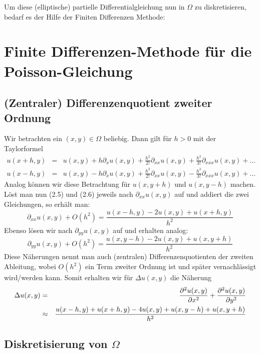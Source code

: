 Um diese (elliptische) partielle Differentialgleichung nun in $\Omega$ zu diskretisieren, bedarf es der Hilfe der Finiten Differenzen Methode:

\section{Finite Differenzen-Methode für die Poisson-Gleichung}\label{s.Finite Differenzen}

\subsection{(Zentraler) Differenzenquotient zweiter Ordnung}

Wir betrachten ein $(x,y) \in \Omega$ beliebig. Dann gilt für $h > 0$ mit der Taylorformel
\begin{eqnarray}
u(x+h,y) &=& u(x,y) + h \partial_{x} u(x,y) + \frac {h^{2}} {2!} \partial_{xx} u(x,y) + \frac {h^{3}} {3!} \partial_{xxx} u(x,y) + ... \\
u(x-h,y) &=& u(x,y) - h \partial_{x} u(x,y) + \frac {h^{2}} {2!} \partial_{xx} u(x,y) - \frac {h^{3}} {3!} \partial_{xxx} u(x,y) + ...
\end{eqnarray}
Analog können wir diese Betrachtung für $u(x,y+h)$ und $u(x,y-h)$ machen. \\
Löst man nun (2.5) und (2.6) jeweils nach $\partial_{xx} u(x,y)$ auf und addiert die zwei Gleichungen, so erhält man:
\begin{equation}
\partial_{xx} u(x,y) + O(h^{2}) = \frac {u(x-h,y) - 2u(x,y) + u(x+h,y)} {h^{2}}
\end{equation}
Ebenso lösen wir nach $\partial_{yy} u(x,y)$ auf und erhalten analog:
\begin{equation}
\partial_{yy} u(x,y) + O(h^{2}) = \frac {u(x,y-h) - 2u(x,y) + u(x,y+h)} {h^{2}}
\end{equation}
Diese Näherungen nennt man auch (zentralen) Differenzenquotienten der zweiten Ableitung, wobei $O(h^{2})$ ein Term zweiter Ordnung ist und später vernachlässigt wird/werden kann.
Somit erhalten wir für $\Delta u(x,y)$ die Näherung
\begin{eqnarray}
\Delta u(x,y) &=& \frac {\partial^{2} u(x,y)} {\partial x^{2}} + \frac {\partial^{2} u(x,y)} {\partial y^{2}} \notag \\
&\approx& \frac {u(x-h,y) + u(x+h,y) - 4u(x,y) + u(x,y-h) + u(x,y+h)} {h^{2}}
\end{eqnarray}

\subsection{Diskretisierung von $\Omega$}

